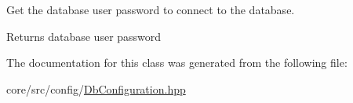 Get the database user password to connect to the database. 

\begin{DoxyReturn}{Returns}
database user password 
\end{DoxyReturn}


The documentation for this class was generated from the following file:\begin{DoxyCompactItemize}
\item 
core/src/config/\hyperlink{DbConfiguration_8hpp}{DbConfiguration.hpp}\end{DoxyCompactItemize}
